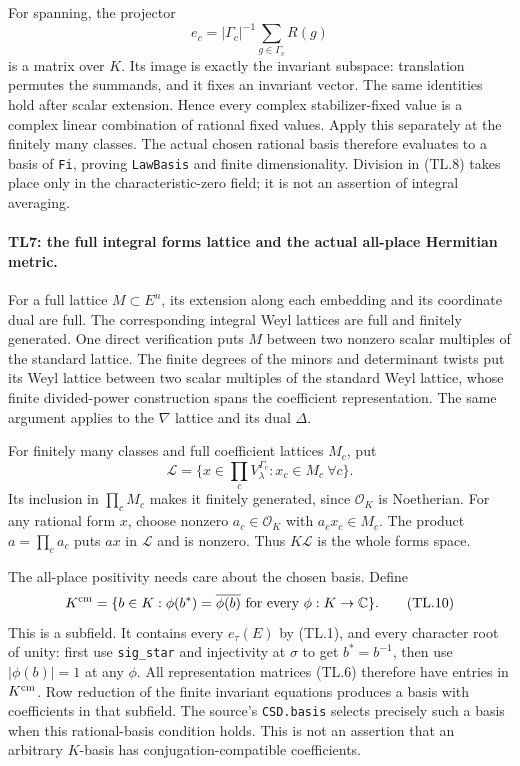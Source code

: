 For spanning, the projector
\[
 e_c=|\Gamma_c|^{-1}\sum_{g\in\Gamma_c}R(g)        \tag{TL.8}
\]
is a matrix over $K$. Its image is exactly the invariant subspace:
translation permutes the summands, and it fixes an invariant vector.
The same identities hold after scalar extension. Hence every complex
stabilizer-fixed value is a complex linear combination of rational
fixed values. Apply this separately at the finitely many classes.
The actual chosen rational basis therefore evaluates to a basis of
\texttt{Fi}, proving \texttt{LawBasis} and finite dimensionality.
Division in (TL.8) takes place only in the characteristic-zero
field; it is not an assertion of integral averaging.

\paragraph{TL7: the full integral forms lattice and the actual
all-place Hermitian metric.}
For a full lattice $M\subset E^n$, its extension along each embedding
and its coordinate dual are full. The corresponding integral Weyl
lattices are full and finitely generated. One direct verification
puts $M$ between two nonzero scalar multiples of the standard
lattice. The finite degrees of the minors and determinant twists
put its Weyl lattice between two scalar multiples of the standard
Weyl lattice, whose finite divided-power construction spans the
coefficient representation. The same argument applies to the
$\nabla$ lattice and its dual $\Delta$.

For finitely many classes and full coefficient lattices $M_c$, put
\[
 \mathcal L=\{x\in\textstyle\prod_cV_\lambda^{\Gamma_c}:
                         x_c\in M_c\ \forall c\}. \tag{TL.9}
\]
Its inclusion in $\prod_c M_c$ makes it finitely generated, since
$\mathcal O_K$ is Noetherian. For any rational form $x$, choose
nonzero $a_c\in\mathcal O_K$ with $a_cx_c\in M_c$. The product
$a=\prod_c a_c$ puts $ax$ in $\mathcal L$ and is nonzero.
Thus $K\mathcal L$ is the whole forms space.

The all-place positivity needs care about the chosen basis. Define
\[
 K^{\rm cm}=\{b\in K:\phi(b^*)=\overline{\phi(b)}
                       \text{ for every }\phi:K\to\mathbb C\}.
 \tag{TL.10}
\]
This is a subfield. It contains every $e_\tau(E)$ by (TL.1), and
every character root of unity: first use \texttt{sig\_star} and
injectivity at $\sigma$ to get $b^*=b^{-1}$, then use $|\phi(b)|=1$
at any $\phi$. All representation matrices (TL.6) therefore have
entries in $K^{\rm cm}$. Row reduction of the finite invariant
equations produces a basis with coefficients in that subfield.
The source's \texttt{CSD.basis} selects precisely such a basis when
this rational-basis condition holds. This is not an assertion that
an arbitrary $K$-basis has conjugation-compatible coefficients.

